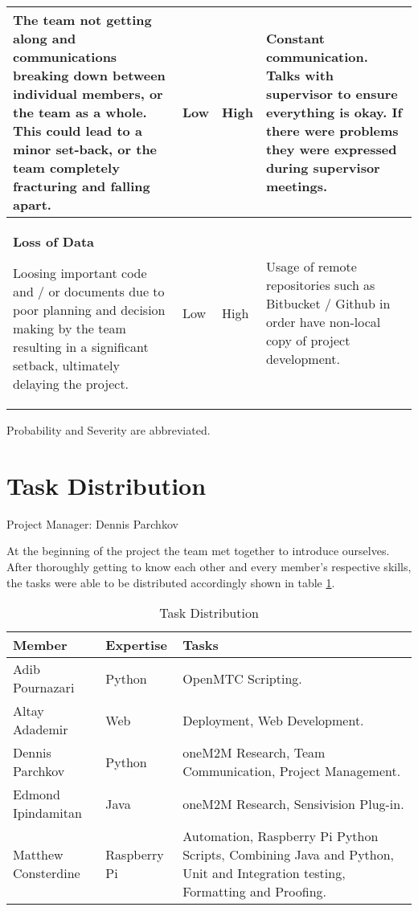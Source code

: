 \begin{table}[H]
\begin{adjustwidth}{-1.5cm}{-1.5cm}
{\begin{tabularx}{\textwidth+3cm}{| m{8cm} | l | X | m{6cm} |}
The team not getting along and communications breaking down between individual members, or the team as a whole. This could lead to a minor set-back, or the team completely fracturing and falling apart. & Low & High & Constant communication. Talks with supervisor to ensure everything is okay. If there were problems they were expressed during supervisor meetings. \\
\hline
\textbf{Loss of Data}

Loosing important code and / or documents due to poor planning and decision making by the team resulting in a significant setback, ultimately delaying the project.& Low & High & Usage of remote repositories such as Bitbucket / Github in order have non-local copy of project development. \\
\hline
\end{tabularx}}
Probability and Severity are abbreviated.
\end{adjustwidth}
\end{table}

\section{Task Distribution}

Project Manager: Dennis Parchkov

At the beginning of the project the team met together to introduce ourselves. After thoroughly getting to know each other and every member's respective skills, the tasks were able to be distributed accordingly shown in table \ref{task-distribution}.

\begin{table}[H]
\centering
\begin{tabularx}{\textwidth}{|l|l|X|}
\hline
\textbf{Member}              & \textbf{Expertise} & \textbf{Tasks}           				\\ 
\hline
Adib Pournazari     & Python           & OpenMTC Scripting. 				\\ 
\hline
Altay Adademir      & Web              & Deployment, Web Development.              				\\
\hline
Dennis Parchkov     & Python           & oneM2M Research, Team Communication, Project Management.                				\\
\hline
Edmond Ipindamitan  & Java             & oneM2M Research, Sensivision Plug-in.			\\ 
\hline
Matthew Consterdine & Raspberry Pi    & Automation, Raspberry Pi Python Scripts, Combining Java and Python, Unit and Integration testing, Formatting and Proofing.	\\ \hline
\end{tabularx}
\caption{Task Distribution}
\label{task-distribution}
\end{table}

